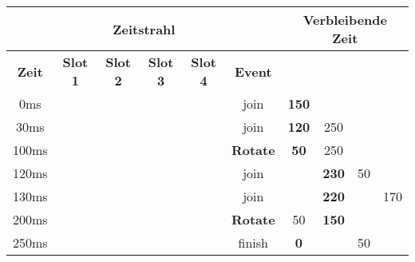 \documentclass{article}
\begin{document}
\begin{table}[!h]
    \centering
    \begin{tabular}{c|cccc|c|cccc}
        \multicolumn{6}{c}{\textbf{Zeitstrahl}} & \multicolumn{4}{|c}{\textbf{Verbleibende Zeit}}                                                                                                                                                         \\ \hline
        \textbf{Zeit}                           & \textbf{Slot 1}                                 & \textbf{Slot 2} & \textbf{Slot 3} & \textbf{Slot 4} & \textbf{Event}   & \textbf{\PZero{}} & \textbf{\POne{}} & \textbf{\PTwo{}} & \textbf{\PThree{}} \\ \hline
        0ms                                     & \PZero{}                                        &                 &                 &                 & \PZero{} join    & \textbf{150}      &                  &                  &                    \\
        30ms                                    & \PZero{}                                        & \POne{}         &                 &                 & \POne{} join     & \textbf{120}      & 250              &                  &                    \\
        100ms                                   & \POne{}                                         & \PZero{}        &                 &                 & \textbf{Rotate}  & \textbf{50}       & 250              &                  &                    \\
        120ms                                   & \POne{}                                         & \PZero{}        & \PTwo{}         &                 & \PTwo{} join     &                   & \textbf{230}     & 50               &                    \\
        130ms                                   & \POne{}                                         & \PZero{}        & \PTwo{}         & \PThree{}       & \PThree{} join   &                   & \textbf{220}     &                  & 170                \\
        200ms                                   & \PZero{}                                        & \PTwo{}         & \PThree{}       & \POne{}         & \textbf{Rotate}  & 50                & \textbf{150}     &                  &                    \\
        250ms                                   & \PTwo{}                                         & \PThree{}       & \POne{}         &                 & \PZero{} finish  & \textbf{0}        &                  & 50               &                    \\

\end{tabular}
\end{table}
\end{document}
